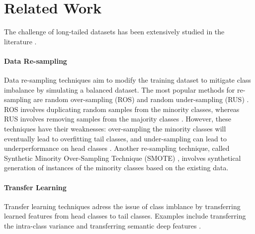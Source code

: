 


\section{Related Work}
The challenge of long-tailed datasets has been extensively studied in the literature \cite{zhang2023deep,zhang2024systematicreviewlongtailedlearning}. %

\paragraph{Data Re-sampling}
Data re-sampling techniques aim to modify the training dataset to mitigate class imbalance by simulating a balanced dataset. The most popular methods for re-sampling are random over-sampling (ROS) and random under-sampling (RUS) \cite{Chawla_2002,han2005}. ROS involves duplicating random samples from the minority classes, whereas RUS involves removing samples from the majority classes \cite{zhang2023deep,han2005}. However, these techniques have their weaknesses: over-sampling the minority classes will eventually lead to overfitting tail classes, and under-sampling can lead to underperformance on head classes \cite{zhang2023deep}. Another re-sampling technique, called Synthetic Minority Over-Sampling Technique (SMOTE) \cite{Chawla_2002}, involves synthetical generation of instances of the minority classes based on the existing data. 

\paragraph{Transfer Learning}
Transfer learning techniques adress the issue of class imblance by transferring learned features from head classes to tail classes. Examples include transferring the intra-class variance \cite{yin2019featuretransferlearningdeep} and transferring semantic deep features \cite{liu2019largescalelongtailedrecognitionopen}.

